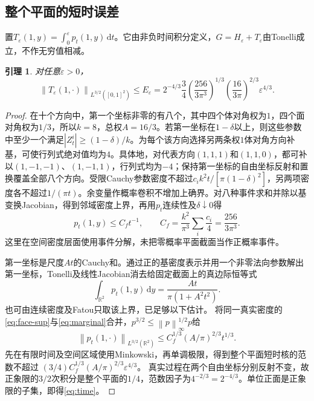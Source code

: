 \documentclass[UTF8,11pt,a4paper,fontset=fandol]{ctexart}
\newtheorem{lemma}[theorem]{引理}
\theoremstyle{definition}\newtheorem{definition}[theorem]{定义}
\theoremstyle{remark}\newtheorem{remark}[theorem]{注}
\newcommand{\R}{\mathbb R}
\newcommand{\dd}{\,\mathrm d}
\newcommand{\norm}[1]{\left\lVert#1\right\rVert}
\newcommand{\abs}[1]{\left|#1\right|}
\begin{document}
\subsection{整个平面的短时误差}
置$T_\varepsilon(1,y)=\int_0^\varepsilon p_t(1,y)\dd t$。它由非负时间积分定义，$G=H_\varepsilon+T_\varepsilon$由Tonelli成立，不作无穷值相减。

\begin{lemma}\label{lem:shorttime}
对任意$\varepsilon>0$，
\begin{equation}\label{eq:time}
 \norm{T_\varepsilon(1,\cdot)}_{L^{3/2}([0,1]^2)}
 \le E_\varepsilon
 =2^{-4/3}\frac34
 \left(\frac{256}{3\pi^3}\right)^{1/3}
 \left(\frac{16}{3\pi}\right)^{2/3}\varepsilon^{4/3}.
\end{equation}
\end{lemma}
\begin{proof}
在十个方向中，第一个坐标非零的有八个，其中四个体对角权为$1$，四个面对角权为$1/3$，所以$k=8$，总权$A=16/3$。若第一坐标在$1-\delta$以上，则这些参数中至少一个满足$\abs{Z_t^i}\ge(1-\delta)/k$。为每个该方向选择另两条权$1$体对角方向补基，可使行列式绝对值均为$4$。具体地，对代表方向$(1,1,1)$和$(1,1,0)$，都可补以$(1,-1,-1)$、$(1,-1,1)$，行列式均为$-4$；保持第一坐标的自由坐标反射和置换覆盖全部八个方向。受限Cauchy参数密度不超过$c_ik^2t/[\pi(1-\delta)^2]$，另两项密度各不超过$1/(\pi t)$。余变量作概率卷积不增加上确界。对八种事件求和并除以基变换Jacobian，得到邻域密度上界，再用$p_t$连续性及$\delta\downarrow0$得
\begin{equation}\label{eq:face-sup}
 p_t(1,y)\le C_ft^{-1},\qquad
 C_f=\frac{k^2}{\pi^3}\sum_i\frac{c_i}{4}
     =\frac{256}{3\pi^3}.
\end{equation}
这里在空间密度层面使用事件分解，未把零概率平面截面当作正概率事件。

第一坐标是尺度$At$的Cauchy和。通过正的基密度表示并用一个非零法向参数解出第一坐标，Tonelli及线性Jacobian消去给固定截面上的真边际恒等式
\begin{equation}\label{eq:marginal}
 \int_{\R^2}p_t(1,y)\dd y=\frac{At}{\pi(1+A^2t^2)}.
\end{equation}
也可由连续密度及Fatou只取该上界，已足够以下估计。
将同一真实密度的\eqref{eq:face-sup}与\eqref{eq:marginal}合并，$p^{3/2}\le\norm p_\infty^{1/2}p$给
\[
 \norm{p_t(1,\cdot)}_{L^{3/2}(\R^2)}
 \le C_f^{1/3}(A/\pi)^{2/3}t^{1/3}.
\]
先在有限时间及空间区域使用Minkowski，再单调极限，得到整个平面短时核的范数不超过
$(3/4)C_f^{1/3}(A/\pi)^{2/3}\varepsilon^{4/3}$。
真实过程在两个自由坐标分别反射不变，故正象限的$3/2$次积分是整个平面的$1/4$，范数因子为$4^{-2/3}=2^{-4/3}$。单位正面是正象限的子集，即得\eqref{eq:time}。
\end{proof}
\end{document}
